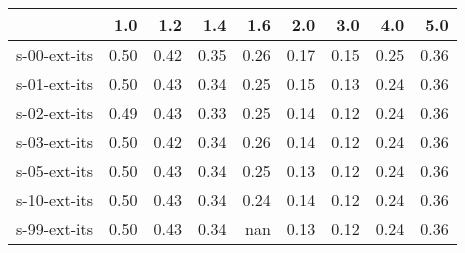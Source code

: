 \begin{tabular}{lrrrrrrrr}
\toprule
{} &  1.0 &  1.2 &  1.4 &  1.6 &  2.0 &  3.0 &  4.0 &  5.0 \\
\midrule
s-00-ext-its & 0.50 & 0.42 & 0.35 & 0.26 & 0.17 & 0.15 & 0.25 & 0.36 \\
s-01-ext-its & 0.50 & 0.43 & 0.34 & 0.25 & 0.15 & 0.13 & 0.24 & 0.36 \\
s-02-ext-its & 0.49 & 0.43 & 0.33 & 0.25 & 0.14 & 0.12 & 0.24 & 0.36 \\
s-03-ext-its & 0.50 & 0.42 & 0.34 & 0.26 & 0.14 & 0.12 & 0.24 & 0.36 \\
s-05-ext-its & 0.50 & 0.43 & 0.34 & 0.25 & 0.13 & 0.12 & 0.24 & 0.36 \\
s-10-ext-its & 0.50 & 0.43 & 0.34 & 0.24 & 0.14 & 0.12 & 0.24 & 0.36 \\
s-99-ext-its & 0.50 & 0.43 & 0.34 &  nan & 0.13 & 0.12 & 0.24 & 0.36 \\
\bottomrule
\end{tabular}
